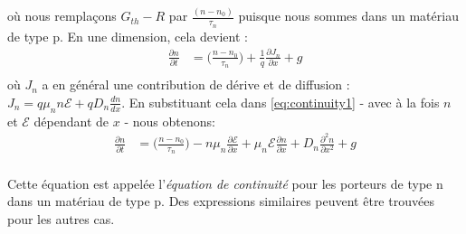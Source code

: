 où nous remplaçons $G_{th} - R$ par $\frac{(n-n_0)}{\tau_n}$ puisque nous sommes dans un matériau de type p. En une dimension, cela devient :
\begin{equation} 
	\begin{split}
		\frac{\partial n}{\partial t}	 &= \Big(\frac{n-n_0}{\tau_n}\Big) + \frac{1}{q} \frac{\partial J_n}{\partial x} + g\\
	\end{split}
\label{eq:continuity1}
\end{equation}
où $J_n$ a en général une contribution de dérive et de diffusion : $J_n = q \mu_n n \mathcal{E} + q D_n \frac{dn}{dx}$. En substituant cela dans \ref{eq:continuity1} - avec à la fois $n$ et $\mathcal{E}$ dépendant de $x$ - nous obtenons:
\begin{equation} 
	\begin{split}
		\frac{\partial n}{\partial t}	 &= \Big(\frac{n-n_0}{\tau_n}\Big) - n \mu_n \frac{\partial \mathcal{E}}{\partial x} + \mu_n \mathcal{E} \frac{\partial n}{\partial x} + D_n \frac{\partial^2 n}{\partial x^2} + g\\
	\end{split}
	\label{eq:continuity}
\end{equation}

Cette équation est appelée l'\emph{équation de continuité} pour les porteurs de type n dans un matériau de type p. Des expressions similaires peuvent être trouvées pour les autres cas.

